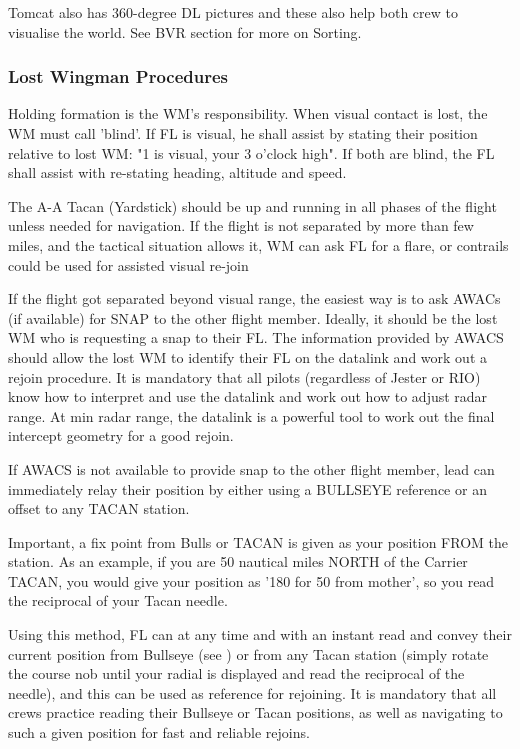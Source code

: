 Tomcat also has 360-degree DL pictures and these also help both crew to
visualise the world. See BVR section for more on Sorting.

\subsubsection{Lost Wingman Procedures}

Holding formation is the WM's responsibility. When visual contact is lost, the
WM must call 'blind'. If FL is visual, he shall assist by stating their
position relative to lost WM: "1 is visual, your 3 o'clock high".  If both are
blind, the FL shall assist with re-stating heading, altitude and speed.

The A-A Tacan (Yardstick) should be up and running in all phases of the flight
unless needed for navigation. If the flight is not separated by more than few
miles, and the tactical situation allows it, WM can ask FL for a flare, or
contrails could be used for assisted visual re-join

If the flight got separated beyond visual range, the easiest way is to ask
AWACs (if available) for SNAP to the other flight member. Ideally, it should be
the lost WM who is requesting a snap to their FL. The information provided by
AWACS should allow the lost WM to identify their FL on the datalink and work
out a rejoin procedure. It is mandatory that all pilots (regardless of Jester
or RIO) know how to interpret and use the datalink and work out how to adjust
radar range. At min radar range, the datalink is a powerful tool to work out
the final intercept geometry for a good rejoin.

If AWACS is not available to provide snap to the other flight member, lead can
immediately relay their position by either using a BULLSEYE reference or an
offset to any TACAN station.

Important, a fix point from Bulls or TACAN is given as your position FROM the
station. As an example, if you are 50 nautical miles NORTH of the Carrier
TACAN, you would give your position as '180 for 50 from mother', so you read
the reciprocal of your Tacan needle.

Using this method, FL can at any time and with an instant read and convey their
current position from Bullseye (see ) or
from any Tacan station (simply rotate the course nob until your radial is
displayed and read the reciprocal of the needle), and this can be used as
reference for rejoining. It is mandatory that all crews practice reading their
Bullseye or Tacan positions, as well as navigating to such a given position for
fast and reliable rejoins.
